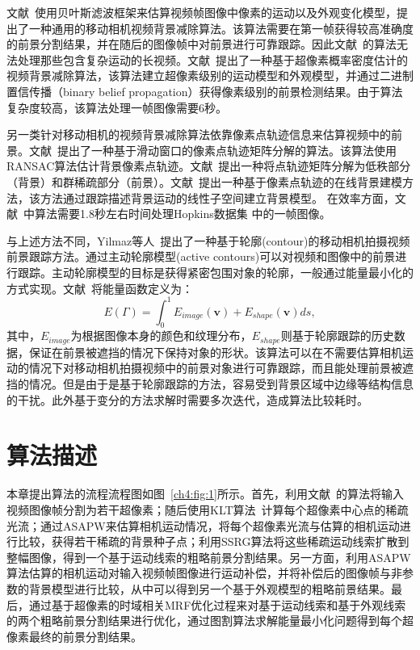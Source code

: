 文献~使用贝叶斯滤波框架来估算视频帧图像中像素的运动以及外观变化模型，提出了一种通用的移动相机视频背景减除算法。该算法需要在第一帧获得较高准确度的前景分割结果，并在随后的图像帧中对前景进行可靠跟踪。因此文献~的算法无法处理那些包含复杂运动的长视频。文献~提出了一种基于超像素概率密度估计的视频背景减除算法，该算法建立超像素级别的运动模型和外观模型，并通过二进制置信传播（binary belief propagation）获得像素级别的前景检测结果。由于算法复杂度较高，该算法处理一帧图像需要6秒。\par

另一类针对移动相机的视频背景减除算法依靠像素点轨迹信息来估算视频中的前景。文献~提出了一种基于滑动窗口的像素点轨迹矩阵分解的算法。该算法使用RANSAC\cite{Ransac}算法估计背景像素点轨迹。文献~提出一种将点轨迹矩阵分解为低秩部分（背景）和群稀疏部分（前景）。文献~提出一种基于像素点轨迹的在线背景建模方法，该方法通过跟踪描述背景运动的线性子空间建立背景模型。 在效率方面，文献~中算法需要1.8秒左右时间处理Hopkins数据集\cite{HopKinsDataSet} 中的一帧图像。\par

与上述方法不同，Yilmaz等人~\cite{contourTracking04}提出了一种基于轮廓(contour)的移动相机拍摄视频前景跟踪方法。通过主动轮廓模型(active contours)\cite{Snakes}可以对视频和图像中的前景进行跟踪。主动轮廓模型的目标是获得紧密包围对象的轮廓，一般通过能量最小化的方式实现。文献~将能量函数定义为：
$$ E(\Gamma) = \int_{0}^{1} E_{image}(\mathbf{v})+ E_{shape}(\mathbf{v}) ds,$$
其中，$E_{image}$为根据图像本身的颜色和纹理分布，$E_{shape}$则基于轮廓跟踪的历史数据，保证在前景被遮挡的情况下保持对象的形状。该算法可以在不需要估算相机运动的情况下对移动相机拍摄视频中的前景对象进行可靠跟踪，而且能处理前景被遮挡的情况。但是由于是基于轮廓跟踪的方法，容易受到背景区域中边缘等结构信息的干扰。此外基于变分的方法求解时需要多次迭代，造成算法比较耗时。

 \section{算法描述}
 \label{ch4:sec:algorithm}
 本章提出算法的流程流程图如图~\ref{ch4:fig:1}所示。首先，利用文献~的算法将输入视频图像帧分割为若干超像素；随后使用KLT算法~\cite{KLT}计算每个超像素中心点的稀疏光流；通过ASAPW来估算相机运动情况，将每个超像素光流与估算的相机运动进行比较，获得若干稀疏的背景种子点；利用SSRG算法将这些稀疏运动线索扩散到整幅图像，得到一个基于运动线索的粗略前景分割结果。另一方面，利用ASAPW算法估算的相机运动对输入视频帧图像进行运动补偿，并将补偿后的图像帧与非参数的背景模型进行比较，从中可以得到另一个基于外观模型的粗略前景结果。最后，通过基于超像素的时域相关MRF优化过程来对基于运动线索和基于外观线索的两个粗略前景分割结果进行优化，通过图割算法\cite{graphcut04}求解能量最小化问题得到每个超像素最终的前景分割结果。

